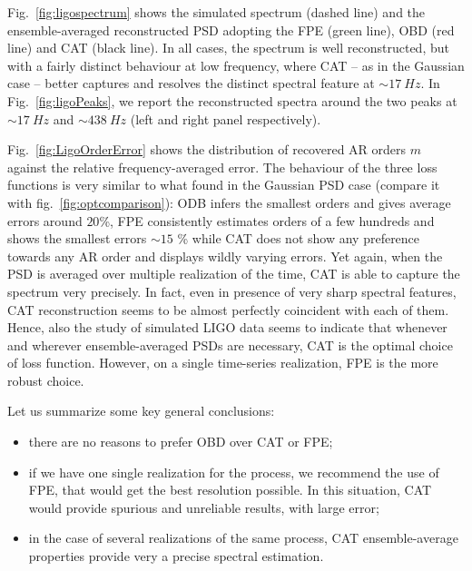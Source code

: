 \documentclass[twocolumn,showpacs,preprintnumbers,nofootinbib,prd,
superscriptaddress,10pt]{revtex4-1}
\begin{document}
Fig.~\ref{fig:ligospectrum} shows the simulated spectrum (dashed line) and the ensemble-averaged reconstructed PSD adopting the FPE (green line), OBD (red line) and CAT (black line).
In all cases, the spectrum is well reconstructed, but with a fairly distinct behaviour at low frequency, where CAT -- as in the Gaussian case -- better captures and resolves the distinct spectral feature at $\sim \SI{17}{Hz}$.
In Fig.~\ref{fig:ligoPeaks}, we report the reconstructed spectra around the two peaks at $\sim \SI{17}{Hz}$ and $\sim \SI{438}{Hz}$ (left and right panel respectively).

Fig.~\ref{fig:LigoOrderError} shows the distribution of recovered AR orders $m$ against the relative frequency-averaged error. The behaviour
of the three loss functions is very similar to what found in the Gaussian PSD case (compare it with fig.~\ref{fig:optcomparison}): ODB infers the smallest orders and gives average errors around $20$\%, FPE consistently estimates orders of a few hundreds and shows the smallest errors $\sim 15$ \% while CAT does not show any preference towards any AR order and displays wildly varying errors. Yet again, when the PSD is averaged over multiple realization of the time, CAT is able to capture the spectrum very precisely. In fact, even in presence of very sharp spectral features, CAT reconstruction seems to be almost perfectly coincident with each of them.
Hence, also the study of simulated LIGO data seems to indicate that whenever and wherever ensemble-averaged PSDs are necessary, CAT is the optimal choice of loss function. However, on a single time-series realization, FPE is the more robust choice.

Let us summarize some key general conclusions:
\begin{itemize}
	\item there are no reasons to prefer OBD over CAT or FPE;
	\item if we have one single realization for the process, we recommend the use of FPE, that would get the best resolution possible. In this situation, CAT would provide spurious and unreliable results, with large error;
	\item in the case of several realizations of the same process, CAT ensemble-average properties provide very a precise spectral estimation.\end{itemize}
\end{document}
